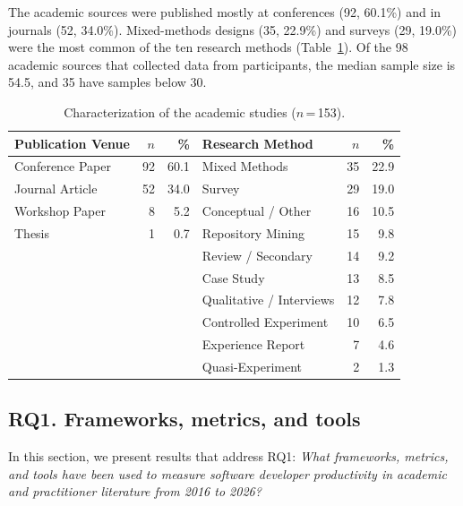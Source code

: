 \documentclass[preprint,number]{elsarticle}
\newcounter{study}
\begin{document}
The academic sources were published mostly at conferences (92, 60.1\%) and in journals (52, 34.0\%). Mixed-methods designs (35, 22.9\%) and surveys (29, 19.0\%) were the most common of the ten research methods (Table~\ref{tab:study_char}). Of the 98 academic sources that collected data from participants, the median sample size is 54.5, and 35 have samples below 30.

\begin{table}[htbp]
\centering
\caption{Characterization of the academic studies ($n$\,=\,153).}
\label{tab:study_char}
\footnotesize
\begin{tabular}{l r r | l r r}
\toprule
\textbf{Publication Venue} & \textbf{$n$} & \textbf{\%} & \textbf{Research Method} & \textbf{$n$} & \textbf{\%} \\
\midrule
Conference Paper     & 92 & 60.1 & Mixed Methods            & 35 & 22.9 \\
Journal Article      & 52 & 34.0 & Survey                   & 29 & 19.0 \\
Workshop Paper       & 8  & 5.2  & Conceptual / Other       & 16 & 10.5 \\
Thesis               & 1  & 0.7  & Repository Mining        & 15 & 9.8  \\
                     &    &      & Review / Secondary       & 14 & 9.2  \\
                     &    &      & Case Study               & 13 & 8.5  \\
                     &    &      & Qualitative / Interviews & 12 & 7.8  \\
                     &    &      & Controlled Experiment    & 10 & 6.5  \\
                     &    &      & Experience Report        & 7  & 4.6  \\
                     &    &      & Quasi-Experiment         & 2  & 1.3  \\
\bottomrule
\end{tabular}
\end{table}

\subsection{RQ1. Frameworks, metrics, and tools}
\label{sec:rq1}

In this section, we present results that address RQ1: \textit{What frameworks, metrics, and tools have been used to measure software developer productivity in academic and practitioner literature from 2016 to 2026?} 
\end{document}
